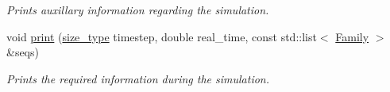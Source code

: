 \begin{DoxyCompactItemize}
\begin{DoxyCompactList}\small\item\em Prints auxillary information regarding the simulation. \end{DoxyCompactList}\item 
\mbox{\label{classretrocombinator_1_1Output_a9b28f297886b9e8f1e764b688c9a9da7}} 
void \hyperlink{classretrocombinator_1_1Output_a9b28f297886b9e8f1e764b688c9a9da7}{print} (\hyperlink{constants_8h_a8e1541b50cee66a791df4c437ccbb385}{size\+\_\+type} timestep, double real\+\_\+time, const std\+::list$<$ \hyperlink{classretrocombinator_1_1Family}{Family} $>$ \&seqs)
\begin{DoxyCompactList}\small\item\em Prints the required information during the simulation. \end{DoxyCompactList}\end{DoxyCompactItemize}
